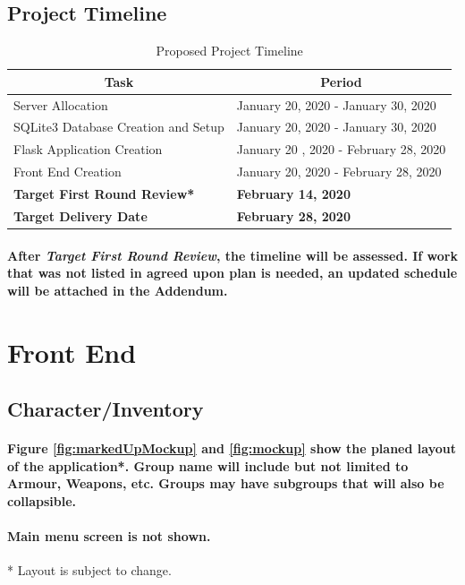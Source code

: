 \documentclass[12pt,letterpaper]{article}
\begin{document}
		\subsection{Project Timeline}
			\begin{table}[hbt]
				\begin{tabular}{|l|l|}
					\hline
					\multicolumn{1}{|c|}{Task} & \multicolumn{1}{|c|}{Period} \\ \hline
					Server Allocation & January 20, 2020 - January 30, 2020 \\ \hline
					SQLite3 Database Creation and Setup & January 20, 2020 - January 30, 2020 \\ \hline
					Flask Application Creation & January 20 , 2020 - February 28, 2020 \\ \hline
					Front End Creation & January 20, 2020 - February 28, 2020 \\ \hline
					\bf{Target First Round Review*} & \bf{February 14, 2020} \\ \hline
					\bf{Target Delivery Date} & \bf{February 28, 2020} \\ \hline
				\end{tabular}
				\caption{Proposed Project Timeline}
				\label{tab:tableProjectTimeline}
			\end{table}
			\paragraph{\indent *After \emph{Target First Round Review}, the timeline will be assessed. If work that was not listed in agreed upon plan is needed, an updated schedule will be attached in the Addendum.\\}
	\section{Front End}
		\subsection{Character/Inventory}
		\paragraph{\indent Figure \ref{fig:markedUpMockup} and \ref{fig:mockup} show the planed layout of the application*. Group name will include but not limited to Armour, Weapons, etc. Groups may have subgroups that will also be collapsible. }
		\paragraph{\indent Main menu screen is not shown.}
		* Layout is subject to change.
\end{document}
